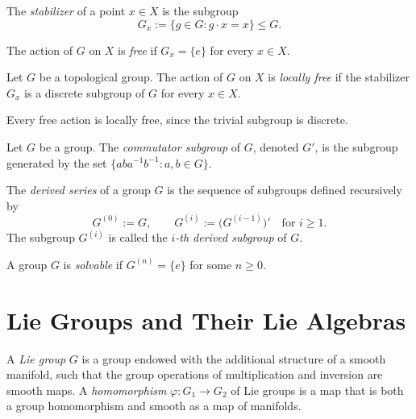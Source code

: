 \begin{definition}
    The \emph{stabilizer} of a point $x \in X$ is the subgroup
    \[
        G_x := \{ g \in G : g \cdot x = x \} \le G.
    \]
\end{definition}

\nocite{tuIntroductoryLecturesEquivariant2020}

\begin{definition}
    The action of $G$ on $X$ is \emph{free} if $G_x = \{e\}$ for every $x \in X$.
\end{definition}

\begin{definition}
    Let $G$ be a topological group. The action of $G$ on $X$ is \emph{locally free} if the stabilizer $G_x$ is a discrete subgroup of $G$ for every $x \in X$.
\end{definition}

Every free action is locally free, since the trivial subgroup is discrete.


\begin{definition}
    Let $G$ be a group. The \emph{commutator subgroup} of $G$, denoted $G'$, is the subgroup generated by the set $\{ aba^{-1}b^{-1} : a, b \in G \}$.
\end{definition}

\begin{definition}
    The \emph{derived series} of a group $G$ is the sequence of subgroups defined recursively by
    \[
        G^{(0)} := G, \qquad G^{(i)} := \big( G^{(i-1)} \big)' \quad \text{for } i \geq 1.
    \]
    The subgroup $G^{(i)}$ is called the \emph{$i$-th derived subgroup} of $G$.
\end{definition}

\begin{definition}
    A group $G$ is \emph{solvable} if $G^{(n)} = \{e\}$ for some $n \geq 0$.
\end{definition}



\section{Lie Groups and Their Lie Algebras}

A \emph{Lie group} $G$ is a group endowed with the additional structure of a smooth manifold, such that the group operations of multiplication and inversion are smooth maps. A \emph{homomorphism} $\varphi : G_1 \to G_2$ of Lie groups is a map that is both a group homomorphism and smooth as a map of manifolds.

